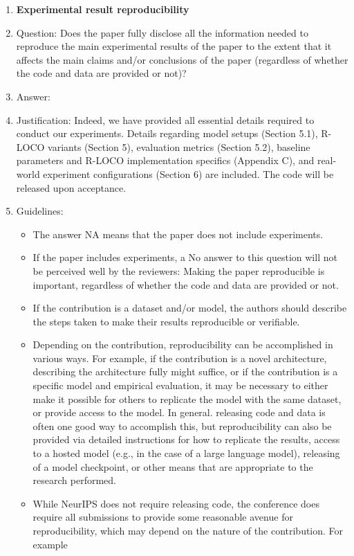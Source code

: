 \documentclass{article}
\theoremstyle{plain}
\theoremstyle{definition}
\theoremstyle{remark}
\begin{document}
\begin{enumerate}
    \item {\bf Experimental result reproducibility}
    \item[] Question: Does the paper fully disclose all the information needed to reproduce the main experimental results of the paper to the extent that it affects the main claims and/or conclusions of the paper (regardless of whether the code and data are provided or not)?
    \item[] Answer: \answerYes{} %
    \item[] Justification: Indeed, we have provided all essential details required to conduct our experiments. Details regarding model setups (Section 5.1), R-LOCO variants (Section 5), evaluation metrics (Section 5.2), baseline parameters and R-LOCO implementation specifics (Appendix C), and real-world experiment configurations (Section 6) are included. The code will be released upon acceptance.
    \item[] Guidelines:
    \begin{itemize}
        \item The answer NA means that the paper does not include experiments.
        \item If the paper includes experiments, a No answer to this question will not be perceived well by the reviewers: Making the paper reproducible is important, regardless of whether the code and data are provided or not.
        \item If the contribution is a dataset and/or model, the authors should describe the steps taken to make their results reproducible or verifiable. 
        \item Depending on the contribution, reproducibility can be accomplished in various ways. For example, if the contribution is a novel architecture, describing the architecture fully might suffice, or if the contribution is a specific model and empirical evaluation, it may be necessary to either make it possible for others to replicate the model with the same dataset, or provide access to the model. In general. releasing code and data is often one good way to accomplish this, but reproducibility can also be provided via detailed instructions for how to replicate the results, access to a hosted model (e.g., in the case of a large language model), releasing of a model checkpoint, or other means that are appropriate to the research performed.
        \item While NeurIPS does not require releasing code, the conference does require all submissions to provide some reasonable avenue for reproducibility, which may depend on the nature of the contribution. For example

\end{itemize}
\end{enumerate}
\end{document}
